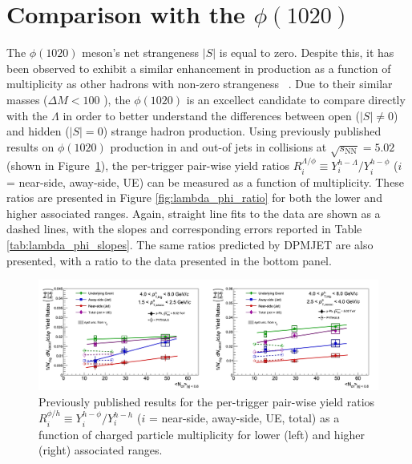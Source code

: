 \section{Comparison with the $\phi(1020)$}
\label{sec:phi_comparison}

The $\phi(1020)$ meson's net strangeness $|S|$ is equal to zero. Despite this, it has been observed to exhibit a similar enhancement in production as a function of multiplicity as other hadrons with non-zero strangeness ~\cite{PhiEnhancement}. Due to their similar masses ($\Delta M < 100$ \MeVmass), the $\phi(1020)$ is an excellect candidate to compare directly with the $\Lambda$ in order to better understand the differences between open ($|S| \neq 0$) and hidden ($|S| = 0$) strange hadron production. Using previously published results on $\phi(1020)$ production in and out-of jets in \pPb collisions at $\sqrt{s_{\text{NN}}} = 5.02$ \TeV ~\cite{JustinPaper} (shown in Figure~\ref{fig:justin_plots}), the per-trigger pair-wise yield ratios $R_{i}^{\Lambda/\phi} \equiv Y_{i}^{h-\Lambda}/Y_{i}^{h-\phi}$ ($i$ = near-side, away-side, UE) can be measured as a function of multiplicity. These ratios are presented in Figure \ref{fig:lambda_phi_ratio} for both the lower and higher associated \pt ranges. Again, straight line fits to the data are shown as a dashed lines, with the slopes and corresponding errors reported in Table \ref{tab:lambda_phi_slopes}. The same ratios predicted by DPMJET are also presented, with a ratio to the data presented in the bottom panel.

\begin{figure}
\centering
\includegraphics[width=\textwidth]{figures/results/justin_plots.png}
\caption{Previously published results for the per-trigger pair-wise yield ratios $R_{i}^{\phi/h} \equiv Y_{i}^{h-\phi}/Y_{i}^{h-h}$ ($i$ = near-side, away-side, UE, total) as a function of charged particle multiplicity for lower (left) and higher (right) associated \pt ranges.}
\label{fig:justin_plots}
\end{figure}

